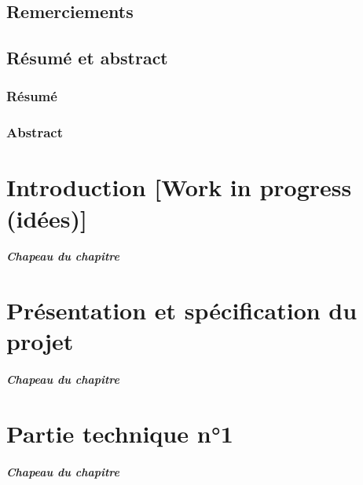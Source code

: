 \documentclass[12pt, french]{report}
\begin{document}

\clearpage

\thispagestyle{empty}
\section*{Remerciements}

\clearpage
\thispagestyle{empty}
\section*{Résumé et abstract}
\subsection*{Résumé}

\subsection*{Abstract}

\clearpage
\setcounter{page}{1}
\tableofcontents
\listoffigures
\lstlistoflistings
\listofalgorithms

\clearpage

\chapter{Introduction [Work in progress (idées)]}
\paragraph{Chapeau du chapitre}

\clearpage

\chapter{Présentation et spécification du projet}
\paragraph{Chapeau du chapitre}

\clearpage

\chapter{Partie technique n°1}
\paragraph{Chapeau du chapitre}

\clearpage
\end{document}
